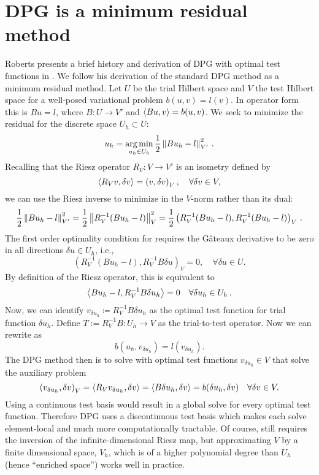 \documentclass[Proposal.tex]{subfiles}
\begin{document}
\section{DPG is a minimum residual method}
Roberts \etal presents a brief history and derivation of DPG with optimal test functions in
\cite{DPGStokes}. We follow his derivation of the standard DPG method as a
minimum residual method. Let $U$ be the trial Hilbert space and $V$ the test
Hilbert space for a well-posed variational problem $b(u,v)=l(v)$. In operator
form this is $Bu=l$, where $B:U\rightarrow V'$ and $\left\langle Bu,v \right\rangle=b(u,v)$. We seek to minimize the
residual for the discrete space $U_h\subset U$:
\begin{equation}
u_h=\operatorname*{arg\,min}_{u_h\in U_h}\frac{1}{2}\left\| Bu_h-l \right\|^2_{V'}\,.
\label{minresidual}
\end{equation}
Recalling that the Riesz operator $R_V:V\rightarrow V'$ is an isometry defined
by
\[
\left\langle R_Vv,\delta v \right\rangle=\left( v,\delta v \right)_V,\quad\forall\delta v\in V,
\]
we can use the Riesz inverse to minimize in the $V$-norm rather than its dual:
\begin{equation}
\frac{1}{2}\left\| Bu_h-l \right\|^2_{V'}=\frac{1}{2}\left\| R_V^{-1}(Bu_h-l) \right\|^2_V
=\frac{1}{2}\left( R_V^{-1}(Bu_h-l),R_V^{-1}(Bu_h-l) \right)_V\,.
\label{eq:rieszapplied}
\end{equation}
The first order optimality condition for  requires
the G\^ateaux derivative to be zero in all directions $\delta u \in
U_h$, i.e.,
\[
\left(R_V^{-1}(Bu_h-l),R_V^{-1}B\delta u\right)_V = 0, \quad \forall \delta u \in U.
\]
By definition of the Riesz operator, this is equivalent to
\begin{equation}
\left\langle Bu_h-l,R_V^{-1}B\delta u_h \right\rangle=0\quad\forall\delta u_h\in U_h\,.
\label{eq:DPGbilinearform}
\end{equation}
Now, we can identify $v_{\delta u_h}\coloneqq R_V^{-1}B\delta u_h$ as the
optimal test function for trial function $\delta u_h$. Define $T:=R_V^{-1}B:U_h\rightarrow V$ as the trial-to-test operator. Now we can rewrite
 as
\begin{equation}
b(u_h,v_{\delta u_h})=l(v_{\delta u_h}).
\label{eq:DPGmethod}
\end{equation}
The DPG method then is to solve  with optimal test functions
$v_{\delta u_h}\in V$ that solve the auxiliary problem
\begin{equation}
\left( v_{\delta u_h},\delta v \right)_V=\left\langle R_Vv_{\delta u_h},\delta v \right\rangle
=\left\langle B\delta u_h,\delta v \right\rangle=b(\delta u_h,\delta v)\quad\forall\delta v\in V.
\label{eq:optimaltestproblem}
\end{equation}
Using a continuous test basis would result in a global solve for every optimal
test function. Therefore DPG uses a discontinuous test basis which makes each
solve element-local and much more computationally tractable. Of course,
 still requires the inversion of the
infinite-dimensional Riesz map, but approximating $V$ by a finite
dimensional space, $V_h$, which is of a higher polynomial degree than $U_h$ (hence
``enriched space'') works well in practice.
\end{document}
